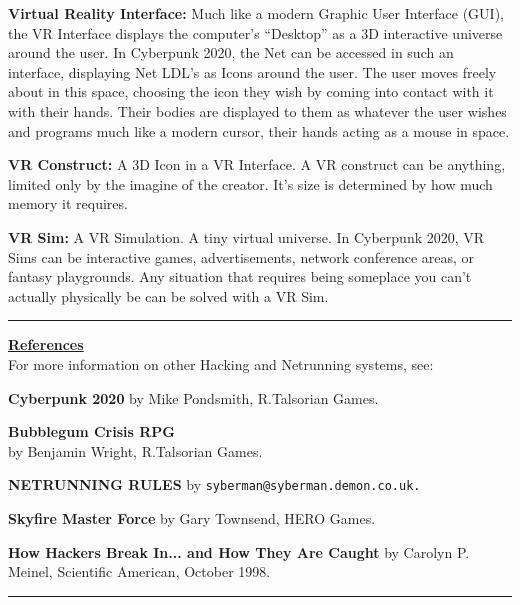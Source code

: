 \documentclass[11pt,twoside,a4paper]{article}
\newenvironment{local_itemize}{
\begin{itemize}
     \setlength{\itemsep}{1pt}
     \setlength{\parskip}{0pt}
     \setlength{\parsep}{0pt}}
{\end{itemize}
}
\begin{document}
\begin{multicols*}{2}
\begin{local_itemize}
	\item[] \textbf{Virtual Reality Interface: } Much like a modern Graphic User Interface (GUI), the VR Interface displays the computer's ``Desktop'' as a 3D interactive universe around the user. In Cyberpunk 2020, the Net can be accessed in such an interface, displaying Net LDL's as Icons around the user. The user moves freely about in this space, choosing the icon they wish by coming into contact with it with their hands. Their bodies are displayed to them as whatever the user wishes and programs much like a modern cursor, their hands acting as a mouse in space.
	\item[] \textbf{VR Construct: } A 3D Icon in a VR Interface. A VR construct can be anything, limited only by the imagine of the creator. It's size is determined by how much memory it requires.
	\item[] \textbf{VR Sim: } A VR Simulation. A tiny virtual universe. In Cyberpunk 2020, VR Sims can be interactive games, advertisements, network conference areas, or fantasy playgrounds. Any situation that requires being someplace you can't actually physically be can be solved with a VR Sim.
\end{local_itemize}

\begin{center} \rule{0.45\textwidth}{0.01cm} \end{center}

\textbf{\underline{\large References}}~\\

For more information on other Hacking and Netrunning systems, see:
\begin{local_itemize}
	\item[] \textbf{Cyberpunk 2020} by Mike Pondsmith, R.Talsorian Games.
	\item[] \textbf{Bubblegum Crisis RPG} ~\\ by Benjamin Wright, R.Talsorian Games.
	\item[] \textbf{NETRUNNING RULES} by \texttt{syberman@syberman.demon.co.uk.}
	\item[] \textbf{Skyfire Master Force} by Gary Townsend, HERO Games.
	\item[] \textbf{How Hackers Break In... and How They Are Caught} by Carolyn P. Meinel, Scientific American, October 1998.
\end{local_itemize}

\begin{center} \rule{0.45\textwidth}{0.01cm} \end{center}


\end{multicols*}
\end{document}
